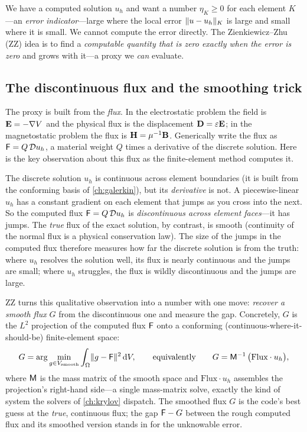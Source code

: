 We have a computed solution $u_h$ and want a number $\eta_K \ge 0$ for each element
$K$---an \emph{error indicator}---large where the local error $\lVert u - u_h\rVert_K$ is
large and small where it is small. We cannot compute the error directly. The
Zienkiewicz--Zhu (ZZ) idea is to find a \emph{computable quantity that is zero
exactly when the error is zero} and grows with it---a proxy we \emph{can} evaluate.

\subsection{The discontinuous flux and the smoothing trick}

The proxy is built from the \emph{flux}. In the electrostatic problem the field is
$\mathbf{E} = -\nabla V$ and the physical flux is the displacement $\mathbf{D} = \varepsilon\mathbf{E}$;
in the magnetostatic problem the flux is $\mathbf{H} = \mu^{-1}\mathbf{B}$. Generically write the
flux as $\mathsf{F} = Q\,\mathcal{D} u_h$, a material weight $Q$ times a derivative of the
discrete solution. Here is the key observation about this flux as the finite-element
method computes it.

The discrete solution $u_h$ is continuous across element boundaries (it is built from
the conforming basis of \cref{ch:galerkin}), but its \emph{derivative} is not. A
piecewise-linear $u_h$ has a constant gradient on each element that jumps as you
cross into the next. So the computed flux $\mathsf{F} = Q\,\mathcal{D} u_h$ is
\emph{discontinuous across element faces}---it has jumps. The \emph{true} flux of the
exact solution, by contrast, is smooth (continuity of the normal flux is a physical
conservation law). The size of the jumps in the computed flux therefore measures how
far the discrete solution is from the truth: where $u_h$ resolves the solution well,
its flux is nearly continuous and the jumps are small; where $u_h$ struggles, the
flux is wildly discontinuous and the jumps are large.

ZZ turns this qualitative observation into a number with one move: \emph{recover a
smooth flux} $G$ from the discontinuous one and measure the gap. Concretely, $G$ is
the $L^2$ projection of the computed flux $\mathsf{F}$ onto a conforming
(continuous-where-it-should-be) finite-element space:
\begin{equation}
G = \arg\min_{g \in V_{\text{smooth}}} \int_\Omega \lVert g - \mathsf{F}\rVert^2 \,\mathrm{d}V,
\qquad\text{equivalently}\qquad
G = \mathsf{M}^{-1}\,\bigl(\text{Flux}\cdot u_h\bigr),
\label{eq:zz-recover}
\end{equation}
where $\mathsf{M}$ is the mass matrix of the smooth space and $\text{Flux}\cdot u_h$
assembles the projection's right-hand side---a single mass-matrix solve, exactly the
kind of system the solvers of \cref{ch:krylov} dispatch. The smoothed flux $G$ is the
code's best guess at the \emph{true}, continuous flux; the gap $\mathsf{F} - G$ between
the rough computed flux and its smoothed version stands in for the unknowable error.


